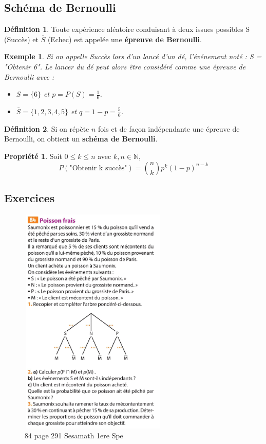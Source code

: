 \documentclass[a4paper,12pt,final]{article}
\newtheorem{Ex}{Exemple}[section]
\theoremstyle{theorem}
\theoremstyle{definition}
\newtheorem{Propriete}{Propriété}[section]
\theoremstyle{definition}
\theoremstyle{definition}
\newtheorem{Def}{Définition}[section]
\begin{document}
	\subsection{Schéma de Bernoulli}
		\begin{Def}
			Toute expérience aléatoire conduisant à deux issues possibles S (Succès) et $\bar{S}$ (Echec) est appelée une \textbf{épreuve de Bernoulli}.
		\end{Def}
		\begin{Ex}
			Si on appelle Succès lors d'un lancé d'un dé, l'événement noté : S = "Obtenir 6". Le lancer du dé peut alors être considéré comme une épreuve de Bernoulli avec :\begin{itemize}
				\item $ S = \{6\}$ et $p = P(S) = \frac{1}{6}$.
				\item $\bar{S} = \{1,2,3,4,5\}$ et $q = 1-p = \frac{5}{6}$.
			\end{itemize}
		\end{Ex}
	
		\begin{Def}
			Si on répète $n$ fois et de façon indépendante une épreuve de Bernoulli, on obtient un \textbf{schéma de Bernoulli}.
		\end{Def}
	
		\begin{Propriete}
			Soit $0 \leq k \leq n$ avec $k,n \in \mathbb{N}$,
			\[P(\text{"Obtenir k succès"}) = \binom{n}{k}p^{k}(1-p)^{n-k}\]
		\end{Propriete}
	
	\subsection{Exercices}
		
		\begin{figure}[h!]
			\centering
			\includegraphics[width=7cm,height=11cm]{Sesamath1ere_84p291.pdf}
			\caption{84 page 291 Sesamath 1ere Spe}
			\label{fig:sesamath1ere84p291}
		\end{figure}		
	
\end{document}
